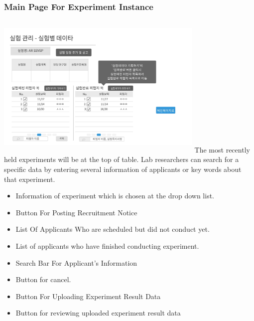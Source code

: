 \documentclass[letterpaper, 10 pt, conference]{ieeeconf}  %
\begin{document}
\subsubsection{Main Page For Experiment Instance\\}
\includegraphics[width=10cm,height = 7cm]{Oven_ver2/18_subMainPage.jpg}
The most recently held experiments will be at the top of table. Lab researchers can search for a specific data by entering several information of applicants or key words about that experiment. 
\begin{itemize}
\item Information of experiment which is chosen at the drop down list.
\item Button For Posting Recruitment Notice 
\item List Of Applicants Who are scheduled but did not conduct yet.
\item List of applicants who have finished conducting experiment.
\item Search Bar For Applicant's Information
\item Button for cancel.
\item Button For Uploading Experiment Result Data
\item Button for reviewing uploaded experiment result data\\
\end{itemize}
\end{document}
